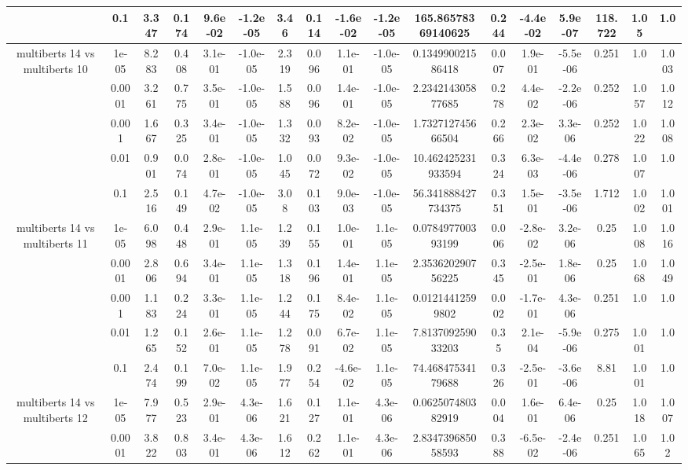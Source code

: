 \begin{tabular}{|c|c|c|c|c|c|c|c|c|c|c|c|c|c|c|c|c|}
 & 0.1 & 3.347 & 0.174 & 9.6e-02 & -1.2e-05 & 3.46 & 0.114 & -1.6e-02 & -1.2e-05 & 165.86578369140625 & 0.244 & -4.4e-02 & 5.9e-07 & 118.722 & 1.05 & 1.0 \\
\hline
\multirow{5}{*}{multiberts 14 vs multiberts 10} & 1e-05 & 8.283 & 0.408 & 3.1e-01 & -1.0e-05 & 2.319 & 0.096 & 1.1e-01 & -1.0e-05 & 0.134990021586418 & 0.007 & 1.9e-01 & -5.5e-06 & 0.251 & 1.0 & 1.003 \\
 & 0.0001 & 3.261 & 0.775 & 3.5e-01 & -1.0e-05 & 1.588 & 0.096 & 1.4e-01 & -1.0e-05 & 2.234214305877685 & 0.278 & 4.4e-02 & -2.2e-06 & 0.252 & 1.057 & 1.012 \\
 & 0.001 & 1.667 & 0.325 & 3.4e-01 & -1.0e-05 & 1.332 & 0.093 & 8.2e-02 & -1.0e-05 & 1.732712745666504 & 0.266 & 2.3e-02 & 3.3e-06 & 0.252 & 1.022 & 1.008 \\
 & 0.01 & 0.901 & 0.074 & 2.8e-01 & -1.0e-05 & 1.045 & 0.072 & 9.3e-02 & -1.0e-05 & 10.462425231933594 & 0.324 & 6.3e-03 & -4.4e-06 & 0.278 & 1.007 & 1.0 \\
 & 0.1 & 2.516 & 0.149 & 4.7e-02 & -1.0e-05 & 3.08 & 0.103 & 9.0e-03 & -1.0e-05 & 56.341888427734375 & 0.351 & 1.5e-01 & -3.5e-06 & 1.712 & 1.002 & 1.001 \\
\hline
\multirow{5}{*}{multiberts 14 vs multiberts 11} & 1e-05 & 6.098 & 0.448 & 2.9e-01 & 1.1e-05 & 1.239 & 0.155 & 1.0e-01 & 1.1e-05 & 0.078497700393199 & 0.006 & -2.8e-02 & 3.2e-06 & 0.25 & 1.008 & 1.016 \\
 & 0.0001 & 2.806 & 0.694 & 3.4e-01 & 1.1e-05 & 1.318 & 0.196 & 1.4e-01 & 1.1e-05 & 2.353620290756225 & 0.345 & -2.5e-01 & 1.8e-06 & 0.25 & 1.068 & 1.049 \\
 & 0.001 & 1.183 & 0.224 & 3.3e-01 & 1.1e-05 & 1.244 & 0.175 & 8.4e-02 & 1.1e-05 & 0.01214412599802 & 0.002 & -1.7e-01 & 4.3e-06 & 0.251 & 1.0 & 1.0 \\
 & 0.01 & 1.265 & 0.152 & 2.6e-01 & 1.1e-05 & 1.278 & 0.091 & 6.7e-02 & 1.1e-05 & 7.813709259033203 & 0.35 & 2.1e-04 & -5.9e-06 & 0.275 & 1.001 & 1.0 \\
 & 0.1 & 2.474 & 0.199 & 7.0e-02 & 1.1e-05 & 1.977 & 0.254 & -4.6e-02 & 1.1e-05 & 74.46847534179688 & 0.326 & -2.5e-01 & -3.6e-06 & 8.81 & 1.001 & 1.0 \\
\hline
\multirow{5}{*}{multiberts 14 vs multiberts 12} & 1e-05 & 7.977 & 0.523 & 2.9e-01 & 4.3e-06 & 1.621 & 0.127 & 1.1e-01 & 4.3e-06 & 0.062507480382919 & 0.004 & 1.6e-01 & 6.4e-06 & 0.25 & 1.018 & 1.007 \\
 & 0.0001 & 3.822 & 0.803 & 3.4e-01 & 4.3e-06 & 1.612 & 0.262 & 1.1e-01 & 4.3e-06 & 2.834739685058593 & 0.388 & -6.5e-02 & -2.4e-06 & 0.251 & 1.065 & 1.02 \\

\end{tabular}
